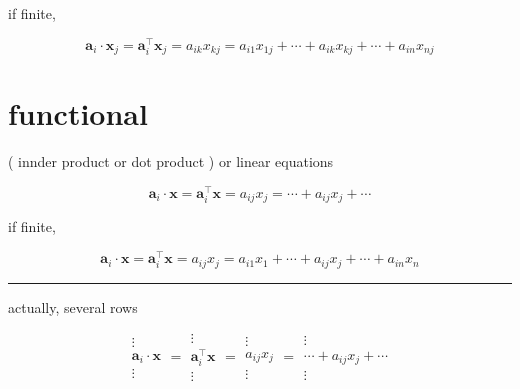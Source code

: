 \documentclass[
]{book}
\theoremstyle{definition}
\theoremstyle{definition}
\theoremstyle{definition}
\theoremstyle{definition}
\theoremstyle{remark}
\begin{document}
if finite,

\[
\boldsymbol{a}_{{\scriptscriptstyle i}}\cdot\boldsymbol{x}_{{\scriptscriptstyle j}}=\boldsymbol{a}_{{\scriptscriptstyle i}}^{\intercal}\boldsymbol{x}_{{\scriptscriptstyle j}}=a_{{\scriptscriptstyle ik}}x_{{\scriptscriptstyle kj}}=a_{{\scriptscriptstyle i1}}x_{{\scriptscriptstyle 1j}}+\cdots+a_{{\scriptscriptstyle ik}}x_{{\scriptscriptstyle kj}}+\cdots+a_{{\scriptscriptstyle in}}x_{{\scriptscriptstyle nj}}
\]

\section{functional}\label{functional}

( innder product or dot product ) or linear equations

\[
\boldsymbol{a}_{{\scriptscriptstyle i}}\cdot\boldsymbol{x}=\boldsymbol{a}_{{\scriptscriptstyle i}}^{\intercal}\boldsymbol{x}=a_{{\scriptscriptstyle ij}}x_{{\scriptscriptstyle j}}=\cdots+a_{{\scriptscriptstyle ij}}x_{{\scriptscriptstyle j}}+\cdots
\]

if finite,

\[
\boldsymbol{a}_{{\scriptscriptstyle i}}\cdot\boldsymbol{x}=\boldsymbol{a}_{{\scriptscriptstyle i}}^{\intercal}\boldsymbol{x}=a_{{\scriptscriptstyle ij}}x_{{\scriptscriptstyle j}}=a_{{\scriptscriptstyle i1}}x_{{\scriptscriptstyle 1}}+\cdots+a_{{\scriptscriptstyle ij}}x_{{\scriptscriptstyle j}}+\cdots+a_{{\scriptscriptstyle in}}x_{{\scriptscriptstyle n}}
\]

\begin{center}\rule{0.5\linewidth}{0.5pt}\end{center}

actually, several rows

\[
\begin{array}{c}
\vdots\\
\boldsymbol{a}_{{\scriptscriptstyle i}}\cdot\boldsymbol{x}\\
\vdots
\end{array}=\begin{array}{c}
\vdots\\
\boldsymbol{a}_{{\scriptscriptstyle i}}^{\intercal}\boldsymbol{x}\\
\vdots
\end{array}=\begin{array}{c}
\vdots\\
a_{{\scriptscriptstyle ij}}x_{{\scriptscriptstyle j}}\\
\vdots
\end{array}=\begin{array}{c}
\vdots\\
\cdots+a_{{\scriptscriptstyle ij}}x_{{\scriptscriptstyle j}}+\cdots\\
\vdots
\end{array}
\]
\end{document}
